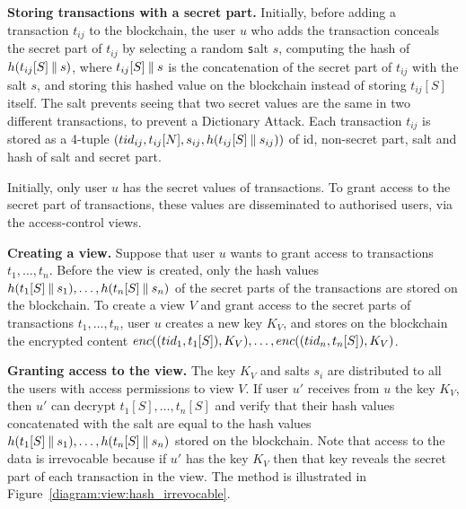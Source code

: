\medskip
\noindent
\textbf{Storing transactions with a secret part.}
Initially, before adding a transaction $t_{ij}$ to the blockchain, the user $u$ who adds the transaction conceals the secret part of  $t_{ij}$ by selecting a  random {\texttt salt\/} $s$, computing the hash of $h(t_{ij}[S] \mathbin\Vert s)$, where $t_{ij}[S] \mathbin\Vert s$ is the concatenation of the secret part of $t_{ij}$ with the salt $s$, and storing this hashed value on the blockchain instead of storing $t_{ij}[S]$ itself. The salt prevents seeing that two secret values are the same in two different transactions, to prevent a Dictionary Attack. Each transaction $t_{ij}$ is stored as a 4-tuple $({tid\/}_{ij}, t_{ij}[N], s_{ij}, h(t_{ij}[S] \mathbin\Vert s_{ij}))$ of id, non-secret part, salt and hash of salt and secret part. 

Initially, only user $u$ has the secret values of transactions. To grant access to the secret part of transactions, these values are disseminated to authorised users, via the access-control views.  

\medskip
\noindent
\textbf{Creating a view.}
Suppose that user $u$ wants to grant access to transactions $t_1, \ldots, t_n$.
Before the view is created, only the hash values $h(t_1[S]\mathbin\Vert s_1), \ldots, h(t_n[S]\mathbin\Vert s_n)$ of the secret parts of the transactions are stored on the blockchain. To create a view $V$ and grant access to the secret parts of transactions $t_1, \ldots, t_n$, user $u$ creates a new key $K_V$, and stores on the blockchain the encrypted content
$enc\/(({tid\/}_{1}, t_{1}[S]), K_V), \ldots, enc\/(({tid\/}_{n}, t_{n}[S]), K_V)$. 

\medskip
\noindent
\textbf{Granting access to the view.}
The key $K_V$ and salts $s_i$ are 
distributed to all the users with access permissions to view $V$. If user $u'$ receives from $u$ the key $K_V$, then $u'$ can decrypt $t_1[S], \ldots, t_n[S]$ and verify that their hash values concatenated with the salt are equal to the hash values $h(t_1[S]\mathbin\Vert s_1), \ldots, h(t_n[S]\mathbin\Vert s_n)$ stored on the blockchain.
Note that access to the data is irrevocable because if $u'$ has the key $K_V$ then that key reveals the secret part of each transaction in the view. The method is illustrated in Figure~\ref{diagram:view:hash_irrevocable}.

